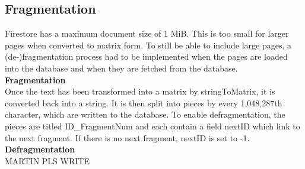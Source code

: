 \subsection{Fragmentation}
Firestore has a maximum document size of 1 MiB. This is too small for larger pages when converted to matrix form. To still be able to include large pages, a (de-)fragmentation process had to be implemented when the pages are loaded into the database and when they are fetched from the database. \\

\textbf{Fragmentation} \\
Once the text has been transformed into a matrix by stringToMatrix, it is converted back into a string. 
It is then split into pieces by every 1,048,287th character, which are written to the database. 
To enable defragmentation, the pieces are titled ID\_FragmentNum and each contain a field nextID which link to the next fragment. 
If there is no next fragment, nextID is set to -1. \\

\textbf{Defragmentation}\\
MARTIN PLS WRITE
